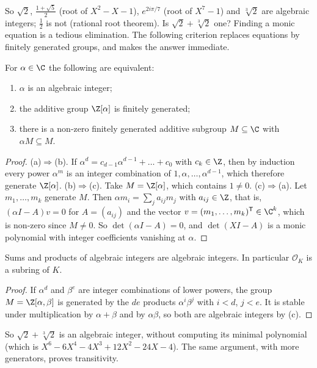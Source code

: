 So $\sqrt2$, $\frac{1+\sqrt5}2$ (root of $X^2-X-1$), $e^{2i\pi/7}$ (root of $X^7-1$) and $\sqrt[3]2$ are algebraic
integers; $\frac12$ is not (rational root theorem). Is $\sqrt2+\sqrt[3]2$ one? Finding a monic equation is a tedious
elimination. The following criterion replaces equations by finitely generated groups, and makes the answer
immediate.

\begin{proposition}\label{prop:intcrit}
For $\alpha\in\C$ the following are equivalent:
\begin{enumerate}[label=(\alph*)]
\item $\alpha$ is an algebraic integer;
\item the additive group $\Z[\alpha]$ is finitely generated;
\item there is a non-zero finitely generated additive subgroup $M\subseteq\C$ with $\alpha M\subseteq M$.
\end{enumerate}
\end{proposition}
\begin{proof}
(a)$\Rightarrow$(b). If $\alpha^d=c_{d-1}\alpha^{d-1}+\dots+c_0$ with $c_k\in\Z$, then by induction every power
$\alpha^m$ is an integer combination of $1,\alpha,\dots,\alpha^{d-1}$, which therefore generate $\Z[\alpha]$.
(b)$\Rightarrow$(c). Take $M=\Z[\alpha]$, which contains $1\ne0$.
(c)$\Rightarrow$(a). Let $m_1,\dots,m_k$ generate $M$. Then $\alpha m_i=\sum_ja_{ij}m_j$ with $a_{ij}\in\Z$, that is,
$(\alpha I-A)v=0$ for $A=(a_{ij})$ and the vector $v=(m_1,\dots,m_k)^{\mathsf T}\in\C^k$, which is non-zero since
$M\ne0$. So $\det(\alpha I-A)=0$, and $\det(XI-A)$ is a monic polynomial with integer coefficients vanishing at $\alpha$.
\end{proof}

\begin{corollary}\label{cor:ring}
Sums and products of algebraic integers are algebraic integers. In particular $\mathcal O_K$ is a subring of $K$.
\end{corollary}
\begin{proof}
If $\alpha^d$ and $\beta^e$ are integer combinations of lower powers, the group $M=\Z[\alpha,\beta]$ is generated by
the $de$ products $\alpha^i\beta^j$ with $i<d$, $j<e$. It is stable under multiplication by $\alpha+\beta$ and by
$\alpha\beta$, so both are algebraic integers by (c).
\end{proof}

So $\sqrt2+\sqrt[3]2$ is an algebraic integer, without computing its minimal polynomial (which is
$X^6-6X^4-4X^3+12X^2-24X-4$). The same argument, with more generators, proves transitivity.

